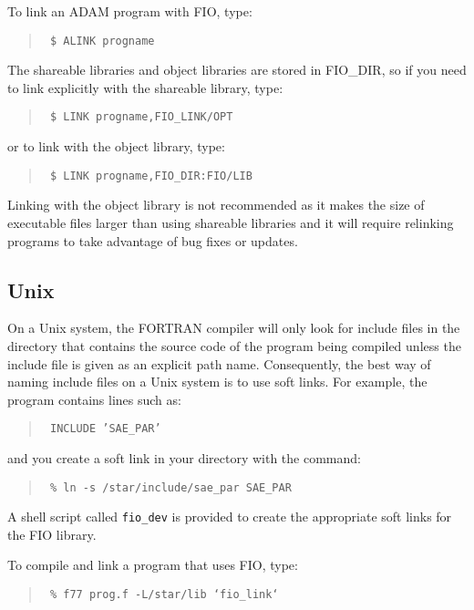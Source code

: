 To link an ADAM program with FIO, type:

\begin{quote}{\tt
\$ ALINK progname
}
\end{quote}

The shareable libraries and object libraries are stored in FIO\_DIR, so if you
need to link explicitly with the shareable library, type:

\begin{quote}{\tt
\$ LINK progname,FIO\_LINK/OPT
}
\end{quote}

or to link with the object library, type:

\begin{quote}{\tt
\$ LINK progname,FIO\_DIR:FIO/LIB
}
\end{quote}

Linking with the object library is not recommended as it makes the size of
executable files larger than using shareable libraries and it will require
relinking programs to take advantage of bug fixes or updates.

\subsection{Unix}

On a Unix system, the FORTRAN compiler will only look for include files in the
directory that contains the source code of the program being compiled unless
the include file is given as an explicit path name. Consequently, the best way
of naming include files on a Unix system is to use soft links. For example, the
program contains lines such as:

\begin{quote}{\tt
      INCLUDE 'SAE\_PAR'
}
\end{quote}

and you create a soft link in your directory with the command:

\begin{quote}{\tt
\% ln -s /star/include/sae\_par SAE\_PAR
}
\end{quote}

A shell script called {\tt fio\_dev} is provided to create the appropriate soft
links for the FIO library.

To compile and link a program that uses FIO, type:

\begin{quote}{\tt
\% f77 prog.f -L/star/lib `fio\_link`
}
\end{quote}

